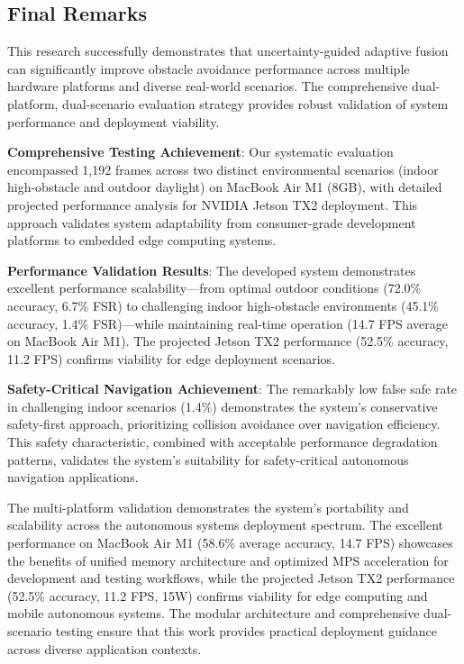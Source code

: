 \documentclass[10pt]{article}
\begin{document}
\subsection{Final Remarks}

This research successfully demonstrates that uncertainty-guided adaptive fusion can significantly improve obstacle avoidance performance across multiple hardware platforms and diverse real-world scenarios. The comprehensive dual-platform, dual-scenario evaluation strategy provides robust validation of system performance and deployment viability.

\textbf{Comprehensive Testing Achievement}:
Our systematic evaluation encompassed 1,192 frames across two distinct environmental scenarios (indoor high-obstacle and outdoor daylight) on MacBook Air M1 (8GB), with detailed projected performance analysis for NVIDIA Jetson TX2 deployment. This approach validates system adaptability from consumer-grade development platforms to embedded edge computing systems.

\textbf{Performance Validation Results}:
The developed system demonstrates excellent performance scalability—from optimal outdoor conditions (72.0\% accuracy, 6.7\% FSR) to challenging indoor high-obstacle environments (45.1\% accuracy, 1.4\% FSR)—while maintaining real-time operation (14.7 FPS average on MacBook Air M1). The projected Jetson TX2 performance (52.5\% accuracy, 11.2 FPS) confirms viability for edge deployment scenarios.

\textbf{Safety-Critical Navigation Achievement}:
The remarkably low false safe rate in challenging indoor scenarios (1.4\%) demonstrates the system's conservative safety-first approach, prioritizing collision avoidance over navigation efficiency. This safety characteristic, combined with acceptable performance degradation patterns, validates the system's suitability for safety-critical autonomous navigation applications.

The multi-platform validation demonstrates the system's portability and scalability across the autonomous systems deployment spectrum. The excellent performance on MacBook Air M1 (58.6\% average accuracy, 14.7 FPS) showcases the benefits of unified memory architecture and optimized MPS acceleration for development and testing workflows, while the projected Jetson TX2 performance (52.5\% accuracy, 11.2 FPS, 15W) confirms viability for edge computing and mobile autonomous systems. The modular architecture and comprehensive dual-scenario testing ensure that this work provides practical deployment guidance across diverse application contexts.
\end{document}
